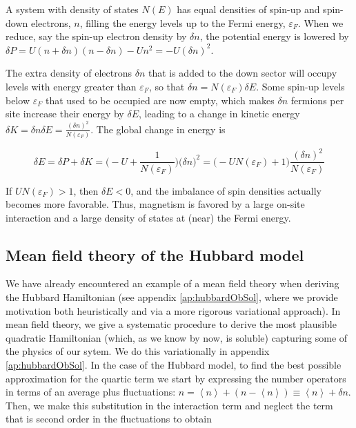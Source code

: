 A system with density of states $N(E)$ has equal densities of spin-up and spin-down electrons, $n$, filling the energy levels up to the Fermi energy, $\varepsilon_F$.
When we reduce, say the spin-up electron density by $\delta n$, the potential energy is lowered by $\delta P = U ( n + \delta n ) ( n - \delta n ) - U n^2 = - U (\delta n)^2$.

The extra density of electrons $\delta n$ that is added to the down sector will occupy levels with energy greater than $\varepsilon_F$, so that $\delta n = N ( \varepsilon_F ) \delta E$.
Some spin-up levels below $\varepsilon_F$ that used to be occupied are now empty, which makes $\delta n$ fermions per site increase their energy by $\delta E$, leading to a change in kinetic energy $\delta K = \delta n \delta E = \frac{(\delta n)^2}{N(\varepsilon_F)}$.
The global change in energy is

\begin{equation}
\delta E = \delta P + \delta K = \bigg( - U + \frac{1}{N(\varepsilon_F)} \bigg) \big( \delta n \big)^2 = \bigg( - U N ( \varepsilon_F ) + 1 \bigg) \frac{(\delta n)^2}{N(\varepsilon_F)}
\end{equation}

If $U N ( \varepsilon_F ) > 1$, then $\delta E < 0$, and the imbalance of spin densities actually becomes more favorable.
Thus, magnetism is favored by a large on-site interaction and a large density of states at (near) the Fermi energy.

\subsection{Mean field theory of the Hubbard model}

We have already encountered an example of a mean field theory when deriving the Hubbard Hamiltonian (see appendix \ref{ap:hubbardObSol}, where we provide motivation both heuristically and via a more rigorous variational approach).
In mean field theory, we give a systematic procedure to derive the most plausible quadratic Hamiltonian (which, as we know by now, is soluble) capturing some of the physics of our sytem.
We do this variationally in appendix \ref{ap:hubbardObSol}.
In the case of the Hubbard model, to find the best possible approximation for the quartic term we start by expressing the number operators in terms of an average plus fluctuations: $n = \left\langle n \right\rangle + ( n - \left\langle n \right\rangle ) \equiv \left\langle n \right\rangle + \delta n$.
Then, we make this substitution in the interaction term and neglect the term that is second order in the fluctuations to obtain

